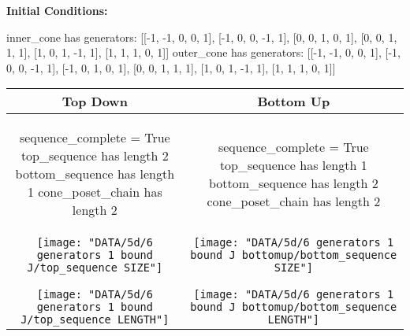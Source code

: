 \documentclass[10pt]{article}
\begin{document}
\textbf{Initial Conditions:}
\begin{SAGE}
inner_cone has generators: 
[[-1, -1, 0, 0, 1], [-1, 0, 0, -1, 1], [0, 0, 1, 0, 1], [0, 0, 1, 1, 1], [1, 0, 1, -1, 1], [1, 1, 1, 0, 1]]
outer_cone has generators: 
[[-1, -1, 0, 0, 1], [-1, 0, 0, -1, 1], [-1, 0, 1, 0, 1], [0, 0, 1, 1, 1], [1, 0, 1, -1, 1], [1, 1, 1, 0, 1]]

\end{SAGE}
\begin{tabular}{c|c}
\textbf{Top Down} & \textbf{Bottom Up} \\ \hline  
\begin{SAGE}
sequence_complete = True
top_sequence has length 2
bottom_sequence has length 1
cone_poset_chain has length 2
\end{SAGE} 
&
\begin{SAGE}
sequence_complete = True
top_sequence has length 1
bottom_sequence has length 2
cone_poset_chain has length 2
\end{SAGE} 
\\ \hline

\begin{minipage}{.4\textwidth}
\texttt{[image: "DATA/5d/6 generators 1 bound J/top\_sequence SIZE"]}
\end{minipage} &
\begin{minipage}{.4\textwidth}
\texttt{[image: "DATA/5d/6 generators 1 bound J bottomup/bottom\_sequence SIZE"]}
\end{minipage} \\ \\
\hline \\\begin{minipage}{.4\textwidth}
\texttt{[image: "DATA/5d/6 generators 1 bound J/top\_sequence LENGTH"]}
\end{minipage} &
\begin{minipage}{.4\textwidth}
\texttt{[image: "DATA/5d/6 generators 1 bound J bottomup/bottom\_sequence LENGTH"]}
\end{minipage}
\end{tabular}
\end{document}
